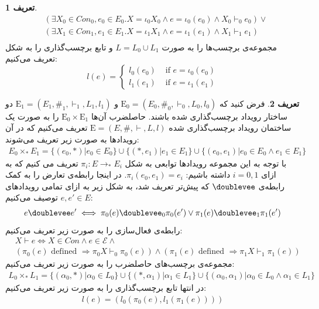 \documentclass[
msc,
irfonts
]{./tex/tehran-thesis}
\newcommand{\پ}{پروژه/پایان‌نامه/رساله }
\theoremstyle{definition}
\newtheorem{definition}{تعریف}[section]
\theoremstyle{theorem}
\theoremstyle{definition}
\numberwithin{algorithm}{chapter}
\newcommand{\s}[1]{\{#1\}}
\newcommand{\ra}{\rightarrow}
\newcommand{\mr}[1]{\mathrm{#1}}
\begin{document}
\begin{definition}
\begin{align*}
                        & (\exists X_0 \in Con_0,e_0 \in E_0.X = \iota_0X_0
        \wedge e = \iota_0(e_0) \wedge X_0 \vdash_0 e_0) \vee                 \\
                        & (\exists X_1 \in Con_1,e_1 \in E_1.X = \iota_1X_1
        \wedge e = \iota_1(e_1) \wedge X_1 \vdash_1 e_1)                      \\
    \end{align*}
    مجموعه‌ی برچسب‌ها را به صورت
    $L = L_0 \cup L_1$
    و تابع برچسب‌گذاری را به شکل تعریف می‌کنیم:
    $$
        l(e) = \begin{cases}
            l_0(e_0) & \text{ if } e = \iota_0(e_0) \\
            l_1(e_1) & \text{ if } e = \iota_1(e_1)
        \end{cases}
    $$
\end{definition}

\begin{definition}
    فرض کنید که
    $\mr{E_0} = (E_0,\#_0,\vdash_0,L_0,l_0)$
    و
    $\mr{E_1} = (E_1,\#_1,\vdash_1,L_1,l_1)$
    دو ساختار رویداد برچسب‌گذاری شده باشند.
    حاصلضرب آن‌ها
    $\mr{E}_0 \times \mr{E}_1$
    را به صورت یک ساختمان رویداد برچسب‌گذاری شده
    $\mr{E} = (E,\#,\vdash,L,l)$
    تعریف می‌کنیم که در‌ آن رویداد‌ها به صورت زیر تعریف می‌شوند:
    \begin{align*}
        E_0 \times_* E_1 =
        \s{(e_0,*)|e_0 \in E_0}
        \cup \s{(*,e_1)|e_1 \in E_1}
        \cup \s{(e_0,e_1)| e_0 \in E_0 \wedge e_1 \in E_1}
    \end{align*}
    با توجه به این مجموعه‌ رویداد‌ها توابعی به شکل
    $\pi_i: E \ra_* E_i$
    تعریف می کنیم که به ازای
    $i=0,1$
    داشته باشیم:
    $\pi_i(e_0,e_1) = e_i$.
    در اینجا رابطه‌ی تعارض را به کمک رابطه‌ی
    $\doublevee$
    که پیش‌تر تعریف شد، به شکل زیر به ازای تمامی رویداد‌های
    $e,e' \in E$
    توصیف می‌کنیم:
    \begin{align*}
        e \doublevee e' \iff
        \pi_0(e)\doublevee_0 \pi_0(e')
        \vee \pi_1(e)\doublevee_1\pi_1(e')
    \end{align*}
    رابطه‌ی فعال‌سازی  را به صورت زیر تعریف می‌کنیم:
    \begin{align*}
         & X \vdash e \iff X \in Con \wedge e \in \mathcal{E} \wedge     \\
         & (\pi_0(e)\text{ defined } \Rightarrow \pi_0X\vdash_0\pi_0(e))
        \wedge (\pi_1(e)\text{ defined } \Rightarrow \pi_1X\vdash_1\pi_1(e))
    \end{align*}
    مجموعه‌ی برچسب‌های حاصلضرب را به صورت زیر تعریف می‌کنیم:
    \begin{align*}
        L_0 \times_* L_1 = \s{ (\alpha_0,*)|\alpha_0 \in L_0}
        \cup \s{(*,\alpha_1)|\alpha_1 \in L_1}
        \cup \s{(\alpha_0,\alpha_1)|\alpha_0 \in L_0 \wedge \alpha_1 \in L_1}
    \end{align*}
    در انتها تابع برچسب‌گذاری را به صورت زیر تعریف می‌کنیم:
    \begin{align*}
        l(e) = (l_0(\pi_0(e),l_1(\pi_1(e))))
    \end{align*}
\end{definition}
\end{document}
